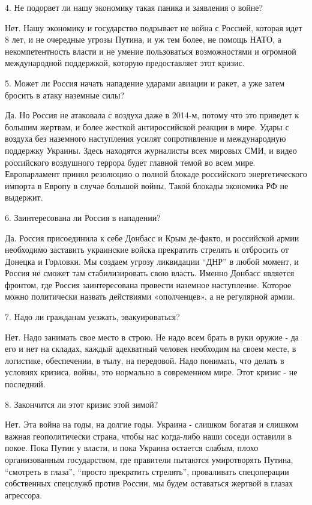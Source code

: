 4. Не подорвет ли нашу экономику такая паника и заявления о войне?

Нет. Нашу экономику и государство подрывает не война с Россией, которая идет 8
лет, и не очередные угрозы Путина, и уж тем более, не помощь НАТО, а
некомпетентность власти и не умение пользоваться возможностями и огромной
международной поддержкой, которую предоставляет этот кризис. 

5. Может ли Россия начать нападение ударами авиации и ракет, а уже затем
бросить в атаку наземные силы?

Да. Но Россия не атаковала с воздуха даже в 2014-м, потому что  это приведет к
большим жертвам, и более жесткой антироссийской реакции в мире. Удары с воздуха
без наземного наступления усилят сопротивление и международную поддержку
Украины. Здесь находятся журналисты всех мировых СМИ, и видео российского
воздушного террора будет главной темой во всем мире. Европарламент принял
резолюцию о полной блокаде российского энергетического импорта в Европу в
случае большой войны. Такой блокады экономика РФ не выдержит.

6. Заинтересована ли Россия в нападении?

Да. Россия присоединила к себе Донбасс и Крым де-факто, и  российской армии
необходимо заставить украинские войска прекратить стрелять и отбросить  от
Донецка и Горловки. Мы создаем угрозу ликвидации \enquote{ДНР} в любой момент, и Россия
не сможет там стабилизировать свою власть. Именно Донбасс является фронтом, где
Россия заинтересована провести наземное наступление. Которое можно политически
назвать действиями «ополченцев», а не регулярной армии.

7. Надо ли гражданам уезжать, эвакуироваться?

Нет. Надо занимать свое место в строю. Не надо всем брать в руки оружие - да
его и нет на складах, каждый адекватный человек необходим на своем месте, в
логистике, обеспечении, в тылу, на передовой. Надо понимать, что делать в
условиях кризиса, войны, это нормально в современном мире. Этот кризис - не
последний.

8. Закончится ли этот кризис этой зимой?

Нет. Эта война на годы, на долгие годы. Украина - слишком богатая и слишком
важная геополитически страна, чтобы нас когда-либо наши соседи оставили в
покое. Пока Путин у власти, и пока Украина остается слабым, плохо
организованным государством, где правители пытаются умиротворять Путина,
\enquote{смотреть в глаза}, \enquote{просто прекратить стрелять}, проваливать спецоперации
собственных спецслужб против России, мы будем оставаться жертвой в глазах
агрессора. 

